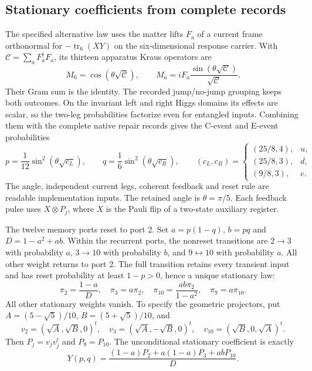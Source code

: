 \subsection{Stationary coefficients from complete records}
\label{subsec:source-flavor-memory}

The specified alternative law uses the matter lifts \(F_a\) of a current
frame orthonormal for \(-\operatorname{tr}_6(XY)\) on the six-dimensional
response carrier. With \(\mathcal C=\sum_aF_a^\dagger F_a\), its thirteen
apparatus Kraus operators are
\[
 M_0=\cos(\theta\sqrt{\mathcal C}),\qquad
 M_a=iF_a\frac{\sin(\theta\sqrt{\mathcal C})}{\sqrt{\mathcal C}}.
\]
Their Gram sum is the identity. The recorded jump/no-jump grouping keeps
both outcomes. On the invariant left and right Higgs domains its effects
are scalar, so the two-leg probabilities factorize even for entangled
inputs. Combining them with the complete native repair records gives the
C-event and E-event probabilities
\begin{equation}
 p=\frac1{12}\sin^2(\theta\sqrt{c_L}),\qquad
 q=\frac1{6}\sin^2(\theta\sqrt{c_R}),\qquad
 (c_L,c_R)=
 \begin{cases}
 (25/8,4),&u,\\
 (25/8,3),&d,\\
 (9/8,3),&e.
 \end{cases}
 \label{eq:source-flavor-gates}
\end{equation}
The angle, independent current legs, coherent feedback and reset rule are
readable implementation inputs. The retained angle is \(\theta=\pi/5\).
Each feedback pulse uses \(X\otimes P_j\), where \(X\) is the Pauli flip
of a two-state auxiliary register.

The twelve memory ports reset to port 2. Set \(a=p(1-q)\), \(b=pq\) and
\(D=1-a^2+ab\). Within the recurrent ports, the nonreset transitions are
\(2\to3\) with probability \(a\), \(3\to10\) with probability \(b\),
and \(9\leftrightarrow10\) with probability \(a\). All other weight
returns to port 2. The full transition retains every transient input and
has reset probability at least \(1-p>0\), hence a unique stationary law:
\begin{equation}
 \pi_2=\frac{1-a}{D},\quad \pi_3=a\pi_2,\quad
 \pi_{10}=\frac{ab\pi_2}{1-a^2},\quad \pi_9=a\pi_{10}.
 \label{eq:source-flavor-stationary}
\end{equation}
All other stationary weights vanish. To specify the geometric projectors,
put \(A=(5-\sqrt5)/10\), \(B=(5+\sqrt5)/10\), and
\[
 v_2=(\sqrt A,\sqrt B,0)^t,\quad
 v_3=(\sqrt A,-\sqrt B,0)^t,\quad
 v_{10}=(\sqrt B,0,\sqrt A)^t.
\]
Then \(P_j=v_jv_j^t\) and \(P_9=P_{10}\). The unconditional stationary
coefficient is exactly
\begin{equation}
 Y(p,q)=\frac{(1-a)P_2+a(1-a)P_3+abP_{10}}{D}.
 \label{eq:source-flavor-Y}
\end{equation}

